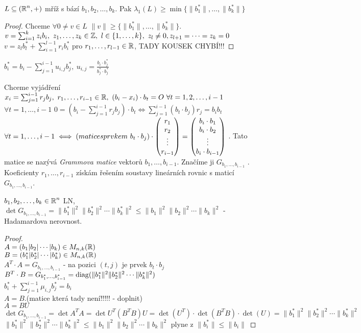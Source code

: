 \begin{lemma}
$L\subseteq (\operatorname{\mathbb{R}}^n,+)$ mříž s bází $b_1,b_2,\ldots,b_k$. Pak $\lambda_1(L)\geq \min \{\|b_1^*\|,\ldots,\|b_k^*\|\}$
\end{lemma}
\begin{proof}
Chceme $\forall 0\neq v\in L$ $\|v\|\geq \{\|b_1^*\|,\ldots,\|b_k^*\|\}$.\\
$v=\sum_{i=1}^k z_ib_i,\ z_1,\ldots,z_k\in\Z,\ l\in\{1,\ldots,k\},\ z_l\neq 0, z_{l+1}=\cdots=z_k=0$\\
$v=z_lb_l^*+\sum_{i=1}^{l-1}r_ib_i^*$ pro $r_1,\ldots,r_{l-1}\in\operatorname{\mathbb{R}}$, TADY KOUSEK CHYBÍ!!!
\end{proof}

\begin{notation}
$b_i^*=b_i-\sum_{j=1}^{i-1} u_{i,j}b_j^*,\ u_{i,j}=\frac{b_i\cdot b_j^*}{b_j^*\cdot b_j^*}$
\end{notation}
Chceme vyjádření $x_i=\sum_{j=1}^{i-1} r_jb_j,\ r_1,\ldots,r_{i-1}\in \operatorname{\mathbb{R}},\ (b_i-x_i)\cdot b_t=O\ \forall t=1,2,\ldots,i-1$\\
$\forall t=1,\ldots,i-1$ $0=(b_i-\sum_{j=1}^{i-1}r_j b_j)\cdot b_t \iff \sum_{j=1}^{i-1}(b_t\cdot b_j)r_j=b_i b_t$ $\forall t=1,\ldots,i-1 \iff (matice s prvkem\  b_t\cdot b_j)\cdot \begin{pmatrix} r_1 \\ r_2 \\ \vdots \\ r_{i-1} \end{pmatrix}=\begin{pmatrix} b_i\cdot b_1 \\ b_i\cdot b_2 \\ \vdots \\ b_i\cdot b_{i-1} \end{pmatrix}$ .
Tato matice se nazývá \emph{Grammova matice} vektorů $b_1,\ldots,b_{i-1}$. Značíme ji
$G_{b_1,\ldots,b_{i-1}}$
.\\
Koeficienty $r_1,\ldots,r_{i-1}$ získám řešením soustavy lineárních rovnic s maticí $G_{b_1,\ldots,b_{i-1}}$.

\begin{claim}
$b_1,b_2,\ldots,b_k\in\operatorname{\mathbb{R}}^n$ LN, $\det G_{b_1,\ldots,b_{i-1}}=\|b_1^*\|^2\|b_2^*\|^2\cdots\|b_k^*\|^2\leq\|b_1\|^2\|b_2\|^2\cdots\|b_k\|^2$ - Hadamardova nerovnost.
\end{claim}

\begin{proof}\phantom{}\\
$A=(b_1|b_2|\cdots|b_k)\in M_{n,k}(\operatorname{\mathbb{R}})$\\
$B=(b_1^*|b_2^*|\cdots|b_k^*)\in M_{n,k}(\operatorname{\mathbb{R}})$\\
$A^T\cdot A=G_{b_1,\ldots,b_{i-1}}$ - na pozici $(t,j)$ je prvek $b_t\cdot b_j$\\
$B^T\cdot B=G_{b_1^*,\ldots,b_{i-1}^*}=\operatorname{diag}(\|b_1^*\|^2\|b_2^*\|^2\cdots\|b_k^*\|^2)$\\
$b_i^*+\sum_{j=1}^{i-1}\mu_{i,j}b_j^*=b_i$\\
$A=B.$(matice která tady není!!!!! -  doplnit)\\
$A=BU$\\
$\det G_{b_1,\ldots,b_{i-1}}=\det A^T A=\det U^T(B^T B)U=\det (U^T)\cdot \det(B^T B)\cdot \det(U)=\|b_1^*\|^2\|b_2^*\|^2\cdots\|b_k^*\|^2$\\
$\|b_1^*\|^2\|b_2^*\|^2\cdots\|b_k^*\|^2\leq\|b_1\|^2\|b_2\|^2\cdots\|b_k\|^2$ plyne z $\|b_i^*\|\leq\|b_i\|$
\end{proof}

